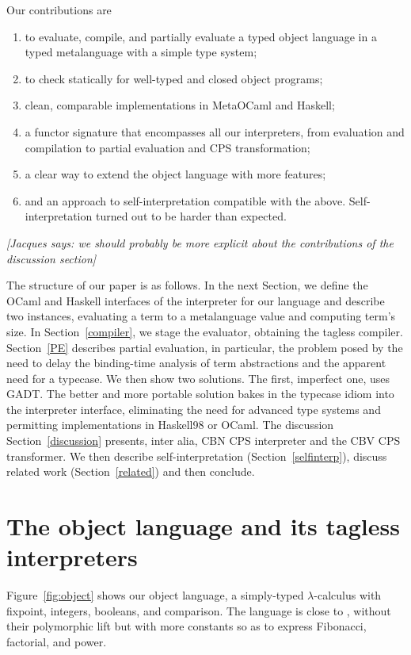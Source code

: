 \documentclass[preprint]{sigplanconf}
\newcommand{\jacques}[1]{{\it [Jacques says: #1]}}
\begin{document}
Our contributions are
\begin{enumerate}
\item to evaluate, compile, and partially evaluate a typed object language
   in a typed metalanguage with a simple type system;
\item to check statically for well-typed and closed object programs;
\item clean, comparable implementations in MetaOCaml and Haskell;
\item a functor signature that encompasses all our interpreters, from
    evaluation and compilation to partial evaluation and CPS transformation;
\item a clear way to extend the object language with more features;
\item and an approach to self\hyp interpretation compatible with the
  above.  Self\hyp interpretation turned out to be harder than expected.
\end{enumerate}

\jacques{we should probably be more explicit about the contributions of
the discussion section}

The structure of our paper is as follows. In the next Section, we
define the OCaml and Haskell interfaces of the interpreter for our
language and describe two instances, evaluating a term to a
metalanguage value and computing term's size. In
Section~\ref{compiler}, we stage the evaluator, obtaining the tagless
compiler. Section~\ref{PE} describes partial evaluation, in
particular, the problem posed by the need to delay the 
binding-time analysis of term abstractions and the apparent 
need for a typecase. We then show two solutions. The first, imperfect
one, uses GADT. The better and more portable solution bakes in the
typecase idiom into the interpreter interface, eliminating the need for
advanced type systems and permitting implementations in Haskell98 or OCaml.
The discussion Section~\ref{discussion} presents, inter alia, CBN CPS
interpreter and the CBV CPS transformer. We then describe 
self-interpretation (Section~\ref{selfinterp}),
discuss related work (Section~\ref{related}) and then conclude.

\section{The object language and its tagless interpreters}\label{language}

Figure~\ref{fig:object} shows our object language, a simply-typed
$\lambda$-calculus with fixpoint, integers, booleans, and comparison.
The language is close to , without their polymorphic
lift but with more constants so as to express Fibonacci, factorial, and
power.
\end{document}
